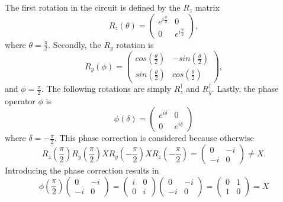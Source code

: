 \documentclass[../../dissertation.tex]{subfiles}
\begin{document}
The first rotation in the circuit is defined by the $R_z$ matrix 
\begin{equation}
	R_z(\theta) = \begin{pmatrix}
		e^{i\frac{\phi}{2}} & 0 \\
		0 & e^{i\frac{\phi}{2}}
	\end{pmatrix},
\end{equation}
where $\theta = \frac{\pi}{2}$. Secondly, the $R_y$ rotation is
\begin{equation}
	R_y(\phi) = \begin{pmatrix}
			cos(\frac{\theta}{2}) & -sin(\frac{\theta}{2}) \\
			sin(\frac{\theta}{2}) & cos(\frac{\theta}{2})
		 \end{pmatrix},
\end{equation}
and $\phi = \frac{\pi}{2}$. The following rotations are simply $R_z^\dagger$ and $R_y^\dagger$. Lastly, the phase operator $\phi$ is 
\begin{equation}
	\phi(\delta) = \begin{pmatrix}
		e^{i\delta} & 0 \\
		0 & e^{i\delta}
		 \end{pmatrix}
\end{equation}
where $\delta = -\frac{\pi}{2}$. This phase correction is considered because otherwise
\begin{equation}
	R_z(\frac{\pi}{2})R_y(\frac{\pi}{2})XR_y(-\frac{\pi}{2})XR_z(-\frac{\pi}{2}) = 
	\begin{pmatrix}
		0 & -i \\
		-i & 0
		 \end{pmatrix} \neq X.
\end{equation}
Introducing the phase correction results in
\begin{equation}
	\phi(\frac{\pi}{2}) 
	\begin{pmatrix}
		0 & -i \\
		-i & 0
		 \end{pmatrix} =  
	\begin{pmatrix}
		i & 0 \\
		0 & i
		 \end{pmatrix}   
	\begin{pmatrix}
		0 & -i \\
		-i & 0
		 \end{pmatrix} =   
	\begin{pmatrix}
		0 & 1 \\
		1 & 0
		 \end{pmatrix} = X  
\end{equation}
\end{document}
